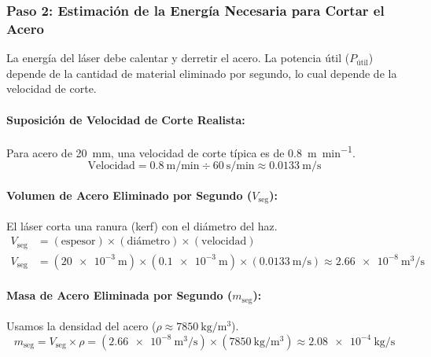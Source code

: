 \documentclass[11pt,a4paper]{article}
\begin{document}
\begin{enumerate}
\subsubsection*{Paso 2: Estimación de la Energía Necesaria para Cortar el Acero}
La energía del láser debe calentar y derretir el acero. La potencia útil ($P_{\text{útil}}$) depende de la cantidad de material eliminado por segundo, lo cual depende de la velocidad de corte.

\paragraph{Suposición de Velocidad de Corte Realista:} Para acero de \SI{20}{\milli\meter}, una velocidad de corte típica es de \SI{0.8}{\meter\per\minute}.
\[ \text{Velocidad} = \SI{0.8}{\meter\per\minute} \div \SI{60}{\second\per\minute} \approx \SI{0.0133}{\meter\per\second} \]

\paragraph{Volumen de Acero Eliminado por Segundo ($V_{\text{seg}}$):}
El láser corta una ranura (kerf) con el diámetro del haz.
\begin{align*}
    V_{\text{seg}} &= (\text{espesor}) \times (\text{diámetro}) \times (\text{velocidad}) \\
    V_{\text{seg}} &= (\SI{20e-3}{\meter}) \times (\SI{0.1e-3}{\meter}) \times (\SI{0.0133}{\meter\per\second}) \approx \SI{2.66e-8}{\meter^3\per\second}
\end{align*}

\paragraph{Masa de Acero Eliminada por Segundo ($m_{\text{seg}}$):}
Usamos la densidad del acero ($\rho \approx \SI{7850}{\kilo\gram\per\meter^3}$).
\[ m_{\text{seg}} = V_{\text{seg}} \times \rho = (\SI{2.66e-8}{\meter^3\per\second}) \times (\SI{7850}{\kilo\gram\per\meter^3}) \approx \SI{2.08e-4}{\kilo\gram\per\second} \]


\end{enumerate}
\end{document}
